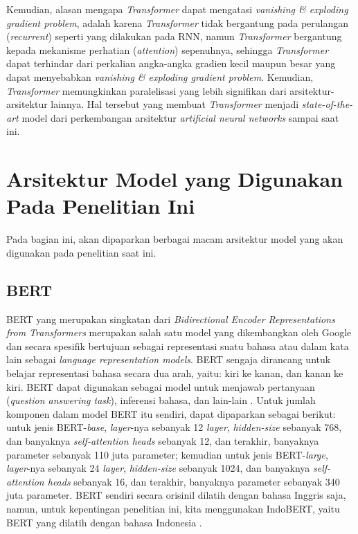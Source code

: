 Kemudian, alasan mengapa \emph{Transformer} dapat mengatasi \emph{vanishing \& exploding gradient problem}, adalah karena \emph{Transformer} tidak bergantung pada perulangan (\emph{recurrent}) seperti yang dilakukan pada RNN, namun \emph{Transformer} bergantung kepada mekanisme perhatian (\emph{attention}) sepenuhnya, sehingga \emph{Transformer} dapat terhindar dari perkalian angka-angka gradien kecil maupun besar yang dapat menyebabkan \emph{vanishing \& exploding gradient problem}. Kemudian, \emph{Transformer} memungkinkan paralelisasi yang lebih signifikan dari arsitektur-arsitektur lainnya. Hal tersebut yang membuat \emph{Transformer} menjadi \emph{state-of-the-art} model dari perkembangan arsitektur \emph{artificial neural networks} sampai saat ini.

\section{Arsitektur Model yang Digunakan Pada Penelitian Ini}
Pada bagian ini, akan dipaparkan berbagai macam arsitektur model yang akan digunakan pada penelitian saat ini.

\subsection{BERT}
BERT yang merupakan singkatan dari \emph{Bidirectional Encoder Representations from Transformers} merupakan salah satu model yang dikembangkan oleh Google dan secara spesifik bertujuan sebagai representasi suatu bahasa atau dalam kata lain sebagai \emph{language representation models}. BERT sengaja dirancang untuk belajar representasi bahasa secara dua arah, yaitu: kiri ke kanan, dan kanan ke kiri. BERT dapat digunakan sebagai model untuk menjawab pertanyaan (\emph{question answering task}), inferensi bahasa, dan lain-lain \citep{devlin-etal-2019-bert}. Untuk jumlah komponen dalam model BERT itu sendiri, dapat dipaparkan sebagai berikut: untuk jenis BERT-\emph{base}, \emph{layer}-nya sebanyak 12 \emph{layer}, \emph{hidden-size} sebanyak 768, dan banyaknya \emph{self-attention heads} sebanyak 12, dan terakhir, banyaknya parameter sebanyak 110 juta parameter; kemudian untuk jenis BERT-\emph{large}, \emph{layer}-nya sebanyak 24 \emph{layer}, \emph{hidden-size} sebanyak 1024, dan banyaknya \emph{self-attention heads} sebanyak 16, dan terakhir, banyaknya parameter sebanyak 340 juta parameter. BERT sendiri secara orisinil dilatih dengan bahasa Inggris saja, namun, untuk kepentingan penelitian ini, kita menggunakan IndoBERT, yaitu BERT yang dilatih dengan bahasa Indonesia \citep{koto2020indolem}.

